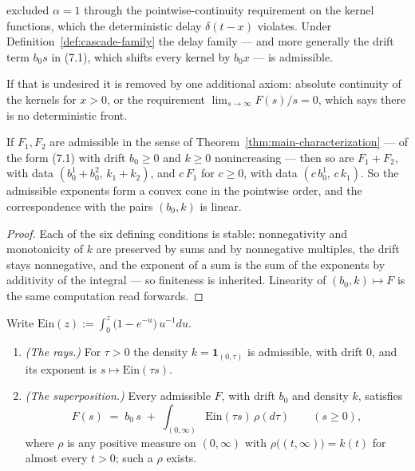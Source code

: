 \begin{remark}[the boundary case $\alpha = 1$ and the drift term]\label{rem:drift-boundary}
 excluded $\alpha = 1$ through the pointwise-continuity
requirement on the kernel functions, which the deterministic delay $\delta(t - x)$ violates.
Under Definition~\ref{def:cascade-family} the delay family --- and more generally the drift
term $b_0 s$ in (7.1), which shifts every kernel by $b_0 x$ --- is admissible.

If that is undesired it is removed by one additional axiom: absolute continuity of the kernels
for $x > 0$, or the requirement $\lim_{s\to\infty} F(s)/s = 0$, which says there is no
deterministic front.
\end{remark}

\begin{lemma}\label{lem:admissible-cone}
If $F_1, F_2$ are admissible in the sense of Theorem~\ref{thm:main-characterization} --- of the
form (7.1) with drift $b_0 \ge 0$ and $k \ge 0$ nonincreasing --- then so are $F_1 + F_2$, with
data $(b_0^1 + b_0^2,\, k_1 + k_2)$, and $c\,F_1$ for $c \ge 0$, with data $(c\,b_0^1,\, c\,k_1)$.
So the admissible exponents form a convex cone in the pointwise order, and the correspondence
with the pairs $(b_0,k)$ is linear.
\end{lemma}

\begin{proof}
Each of the six defining conditions is stable: nonnegativity and monotonicity of $k$ are
preserved by sums and by nonnegative multiples, the drift stays nonnegative, and the exponent of
a sum is the sum of the exponents by additivity of the integral --- so finiteness is inherited.
Linearity of $(b_0,k) \mapsto F$ is the same computation read forwards.
\end{proof}

\begin{lemma}\label{lem:dickman-superposition}
Write $\mathrm{Ein}(z) := \int_0^z \bigl(1 - e^{-u}\bigr)\,u^{-1}du$.
\begin{enumerate}
\item \emph{(The rays.)} For $\tau > 0$ the density $k = \mathbf{1}_{(0,\tau)}$ is admissible,
with drift $0$, and its exponent is $s \mapsto \mathrm{Ein}(\tau s)$.
\item \emph{(The superposition.)} Every admissible $F$, with drift $b_0$ and density $k$,
satisfies
\[
  F(s) \;=\; b_0\, s \;+\; \int_{(0,\infty)} \mathrm{Ein}(\tau s)\,\rho(d\tau)
  \qquad (s \ge 0),
\]
where $\rho$ is any positive measure on $(0,\infty)$ with $\rho\bigl((t,\infty)\bigr) = k(t)$ for
almost every $t > 0$; such a $\rho$ exists.
\end{enumerate}
\end{lemma}

